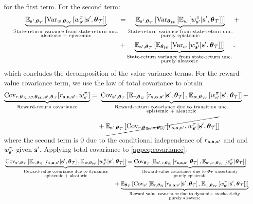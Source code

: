 \documentclass{article}
\begin{document}
for the first term. For the second term:
\begin{align*}
\underbrace{\E_{\ns, \thetamct}\sqb{\Var_{w, \thetamcw} \sqb{\wnb | \ns, \thetamct}}}_{\substack{\text{State-return variance from state-return unc.} \\ \text{aleatoric + epistemic}}} &=  \underbrace{\E_{\ns, \thetamct}\sqb{\Var_{\thetamcw} \sqb{ \E_w \sqb{\wnb | \ns, \thetamct}}}}_{\substack{\text{State-return variance from state-return unc.} \\ \text{purely epistemic}}} +\\
&+  \underbrace{\E_{\ns, \thetamct}\sqb{\E_{\thetamcw} \sqb{ \Var_w \sqb{\wnb | \ns, \thetamct}}}}_{\substack{\text{State-return variance from state-return unc.} \\ \text{purely aleatoric}}}.
\end{align*}
which concludes the decomposition of the value variance terms. For the reward-value covariance term, we use the law of total covariance to obtain
\begin{align}
\underbrace{\Cov_{r, \thetamcr, w, \thetamcw, \ns, \thetamct}[\rsanb, \wnb]}_{\text{Reward-return covariance}} =&~\underbrace{\Cov_{\ns, \thetamct}\sqb{\E_{r, \thetamcr}\sqb{\rsanb | \ns, \thetamct}, \E_{w, \thetamcw}\sqb{\wnb | \ns, \thetamct}}}_{\substack{\text{Reward-return covariance due to transition unc.} \\ \text{epistemic + aleatoric}}} + \nonumber \\
& + \cancel{\E_{\ns, \thetamct}\sqb{\Cov_{r, \thetamcr, w, \thetamcw}\sqb{\rsanb, \wnb | \ns, \thetamct}}}\label{appeq:covariance}
\end{align}
where the second term is 0 due to the conditional independence of $\rsanb$ and and $\wnb$ given $\ns$. Applying total covariance to \cref{appeq:covariance}:
\begin{align} \label{appeq:covrewval} 
&\underbrace{\Cov_{\ns, \thetamct}\sqb{\E_{r, \thetamcr}\sqb{\rsanb | \ns, \thetamct}, \E_{w, \thetamcw}\sqb{\wnb | \ns, \thetamct}}}_{\substack{\text{Reward-value covariance due to dynamics} \\ \text{epistemic + aleatoric}}}  = \underbrace{\Cov_{\thetamct}\sqb{\E_{\ns, r, \thetamcr}\sqb{\rsanb | \thetamct}, \E_{\ns, w, \thetamcw}\sqb{\wnb | \thetamct}}}_{\substack{\text{Reward-value covariance due to $\thetamct$ uncertainty} \\ \text{purely epistemic}}}  \\ 
&\qquad \qquad \qquad \qquad \qquad \qquad \qquad \qquad \qquad ~~~+\underbrace{\E_{\thetamct}\sqb{\Cov_{\ns}\sqb{\E_{r, \thetamcr}\sqb{\rsanb | \ns, \thetamct}, \E_{w, \thetamcw}\sqb{\wnb | \ns, \thetamct}}}}_{\substack{\text{Reward-value covariance due to dynamics stochasticity} \\ \text{purely aleatoric}}} \nonumber 
\end{align}
\end{document}
